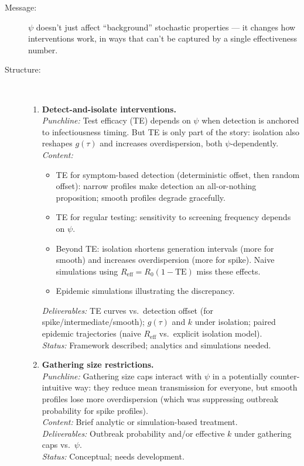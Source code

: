 \begin{description}
    \item[Message:] $\psi$ doesn't just affect ``background'' stochastic properties --- it changes how interventions work, in ways that can't be captured by a single effectiveness number.

    \item[Structure:]~

    \begin{enumerate}
        \item \textbf{Detect-and-isolate interventions.} \\
        \textit{Punchline:} Test efficacy (TE) depends on $\psi$ when detection is anchored to infectiousness timing. But TE is only part of the story: isolation also reshapes $g(\tau)$ and increases overdispersion, both $\psi$-dependently. \\
        \textit{Content:}
        \begin{itemize}
            \item TE for symptom-based detection (deterministic offset, then random offset): narrow profiles make detection an all-or-nothing proposition; smooth profiles degrade gracefully.
            \item TE for regular testing: sensitivity to screening frequency depends on $\psi$.
            \item Beyond TE: isolation shortens generation intervals (more for smooth) and increases overdispersion (more for spike). Naive simulations using $R_\text{eff} = R_0(1 - \text{TE})$ miss these effects.
            \item Epidemic simulations illustrating the discrepancy.
        \end{itemize}
        \textit{Deliverables:} TE curves vs.\ detection offset (for spike/intermediate/smooth); $g(\tau)$ and $k$ under isolation; paired epidemic trajectories (naive $R_\text{eff}$ vs.\ explicit isolation model). \\
        \textit{Status:} Framework described; analytics and simulations needed.

        \item \textbf{Gathering size restrictions.} \\
        \textit{Punchline:} Gathering size caps interact with $\psi$ in a potentially counter-intuitive way: they reduce mean transmission for everyone, but smooth profiles lose more overdispersion (which was suppressing outbreak probability for spike profiles). \\
        \textit{Content:} Brief analytic or simulation-based treatment. \\
        \textit{Deliverables:} Outbreak probability and/or effective $k$ under gathering caps vs.\ $\psi$. \\
        \textit{Status:} Conceptual; needs development.
    \end{enumerate}
\end{description}

